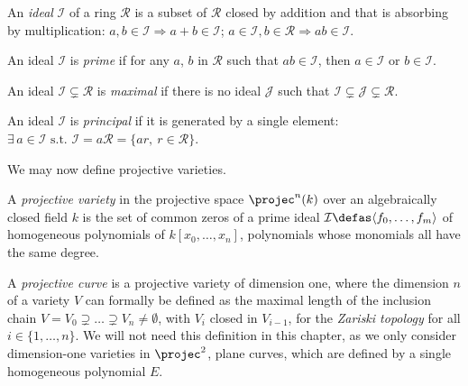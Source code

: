 \begin{defi}
An \emph{ideal} $\mathcal{I}$ of a ring $\mathcal{R}$ is a subset of $\mathcal{R}$ closed by addition and that is absorbing by
multiplication: $a, b \in \mathcal{I} \Rightarrow a + b \in \mathcal{I}$; $a \in \mathcal{I}, b \in \mathcal{R} \Rightarrow
a b \in \mathcal{I}$.

\noindent
An ideal $\mathcal{I}$ is \emph{prime} if for any $a$, $b$ in $\mathcal{R}$ such that $a b \in \mathcal{I}$, then
$a \in \mathcal{I}$ or $b \in \mathcal{I}$.

\noindent
An ideal $\mathcal{I} \subsetneq \mathcal{R}$ is \emph{maximal} if there is no ideal $\mathcal{J}$ such that
$\mathcal{I} \subsetneq \mathcal{J} \subsetneq \mathcal{R}$.

\noindent
An ideal $\mathcal{I}$ is \emph{principal} if it is generated by a single element: $\exists\,a \in \mathcal{I} \text{ s.t. }
\mathcal{I} = a\mathcal{R} = \{a r,~r \in \mathcal{R}\}$.
\end{defi}


We may now define projective varieties.

\begin{defi}
A \emph{projective variety} in the projective space $\projec^n(k)$ over an algebraically closed field $k$ is the set of common zeros
of a prime ideal $\mathcal{I} \defas \langle f_0, \ldots, f_m \rangle$ of homogeneous polynomials of $k[x_0,\ldots,x_n]$, \ie polynomials whose
monomials all have the same degree.
\end{defi}

A \emph{projective curve} is a projective variety of dimension one, where the dimension $n$ of a variety $V$ can formally be defined as
the maximal length of the inclusion chain $V = V_0 \supsetneq \ldots \supsetneq V_n \neq \emptyset$, with $V_i$ closed in $V_{i-1}$, for the \emph{Zariski topology}
for all $i \in \{1,\ldots,n\}$. We will not need this definition in this chapter, as we only consider dimension-one varieties in $\projec^2$, \ie plane curves,
which are defined by a single homogeneous polynomial $E$.

